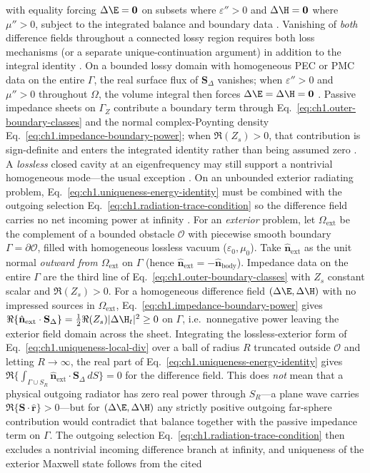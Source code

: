 with equality forcing $\Delta\E=\mathbf{0}$ on subsets where $\varepsilon''>0$ and $\Delta\H=\mathbf{0}$ where $\mu''>0$, subject to the integrated balance and boundary data \cite{stratton1941,harrington2001}. Vanishing of \emph{both} difference fields throughout a connected lossy region requires both loss mechanisms (or a separate unique-continuation argument) in addition to the integral identity \cite{stratton1941,harrington2001}. On a bounded lossy domain with homogeneous PEC or PMC data on the entire $\Gamma$, the real surface flux of $\mathbf{S}_\Delta$ vanishes; when $\varepsilon''>0$ and $\mu''>0$ throughout $\Omega$, the volume integral then forces $\Delta\E=\Delta\H=\mathbf{0}$ \cite{stratton1941}. Passive impedance sheets on $\Gamma_Z$ contribute a boundary term through Eq.~\eqref{eq:ch1.outer-boundary-classes} and the normal complex-Poynting density Eq.~\eqref{eq:ch1.impedance-boundary-power}; when $\Re(Z_s)>0$, that contribution is sign-definite and enters the integrated identity rather than being assumed zero \cite{stratton1941,harrington2001}. A \emph{lossless} closed cavity at an eigenfrequency may still support a nontrivial homogeneous mode---the usual exception \cite{stratton1941,sommerfeld1949}. On an unbounded exterior radiating problem, Eq.~\eqref{eq:ch1.uniqueness-energy-identity} must be combined with the outgoing selection Eq.~\eqref{eq:ch1.radiation-trace-condition} so the difference field carries no net incoming power at infinity \cite{sommerfeld1949,harrington2001}. For an \emph{exterior} problem, let $\Omega_{\mathrm{ext}}$ be the complement of a bounded obstacle $\mathcal{O}$ with piecewise smooth boundary $\Gamma=\partial\mathcal{O}$, filled with homogeneous lossless vacuum ($\varepsilon_0,\mu_0$). Take $\hat{\mathbf{n}}_{\mathrm{ext}}$ as the unit normal \emph{outward from $\Omega_{\mathrm{ext}}$} on $\Gamma$ (hence $\hat{\mathbf{n}}_{\mathrm{ext}}=-\hat{\mathbf{n}}_{\mathrm{body}}$). Impedance data on the entire $\Gamma$ are the third line of Eq.~\eqref{eq:ch1.outer-boundary-classes} with $Z_s$ constant scalar and $\Re(Z_s)>0$. For a homogeneous difference field $(\Delta\E,\Delta\H)$ with no impressed sources in $\Omega_{\mathrm{ext}}$, Eq.~\eqref{eq:ch1.impedance-boundary-power} gives $\Re\{\hat{\mathbf{n}}_{\mathrm{ext}}\cdot\mathbf{S}_\Delta\}=\tfrac12\Re(Z_s)|\Delta\H_t|^{2}\ge0$ on $\Gamma$, i.e.\ nonnegative power leaving the exterior field domain across the sheet. Integrating the lossless-exterior form of Eq.~\eqref{eq:ch1.uniqueness-local-div} over a ball of radius $R$ truncated outside $\mathcal{O}$ and letting $R\to\infty$, the real part of Eq.~\eqref{eq:ch1.uniqueness-energy-identity} gives $\Re\{\int_{\Gamma\cup S_R}\hat{\mathbf{n}}_{\mathrm{ext}}\cdot\mathbf{S}_\Delta\,dS\}=0$ for the difference field. This does \emph{not} mean that a physical outgoing radiator has zero real power through $S_R$---a plane wave carries $\Re\{\mathbf{S}\cdot\hat{\mathbf{r}}\}>0$---but for $(\Delta\E,\Delta\H)$ any strictly positive outgoing far-sphere contribution would contradict that balance together with the passive impedance term on $\Gamma$. The outgoing selection Eq.~\eqref{eq:ch1.radiation-trace-condition} then excludes a nontrivial incoming difference branch at infinity, and uniqueness of the exterior Maxwell state follows from the cited 